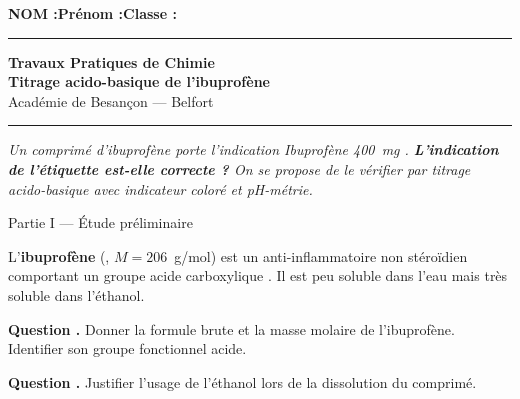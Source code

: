 \documentclass[11pt,a4paper]{article}
\newcommand{\sectitle}[1]{%
  \vspace{6pt}
  \noindent\colorbox{exoheader}{\parbox{\dimexpr\linewidth-2\fboxsep}%
    {\color{white}\bfseries\large\strut\quad #1}}
  \vspace{4pt}
}
\newcounter{question}
\newcommand{\question}{%
  \stepcounter{question}%
  \noindent\textcolor{exoheader}{\textbf{Question \thequestion.}}\quad
}
\begin{document}
\noindent\textbf{NOM :}\hfill\textbf{Prénom :}\hfill\textbf{Classe :}\hfill\phantom{x}\\[0.2cm]
\hrule\vspace{0.2cm}

\begin{center}
  {\large\bfseries\textcolor{exoheader}{Travaux Pratiques de Chimie}}\\[4pt]
  {\LARGE\bfseries Titrage acido-basique de l'ibuprofène}\\[2pt]
  {\small Académie de Besançon --- Belfort}
\end{center}
\hrule\vspace{6pt}

\begin{tcolorbox}[enhanced, colback=problemebg, colframe=exoheader, boxrule=1.5pt,
  title={\faFlask\quad Problématique},
  fonttitle=\bfseries\color{white},
  attach boxed title to top left={yshift=-2mm, xshift=4mm},
  boxed title style={colback=exoheader, colframe=exoheader}]
\textit{Un comprimé d'ibuprofène porte l'indication \og Ibuprofène 400~mg \fg{}.
\textbf{L'indication de l'étiquette est-elle correcte ?}
On se propose de le vérifier par titrage acido-basique avec indicateur coloré et pH-métrie.}
\end{tcolorbox}

\vspace{6pt}

\sectitle{Partie I --- Étude préliminaire}

\begin{mdframed}[backgroundcolor=exolight, linecolor=exoheader, linewidth=1.2pt]
L'\textbf{ibuprofène} (, $M = 206$~g/mol) est un anti-inflammatoire non stéroïdien
comportant un groupe acide carboxylique .
Il est peu soluble dans l'eau mais très soluble dans l'éthanol.
\end{mdframed}

\vspace{4pt}
\question Donner la formule brute et la masse molaire de l'ibuprofène.
Identifier son groupe fonctionnel acide. \dotfill

\vspace{0.3cm}\noindent\dotfill

\question Justifier l'usage de l'éthanol lors de la dissolution du comprimé. \dotfill

\vspace{0.3cm}\noindent\dotfill
\end{document}
